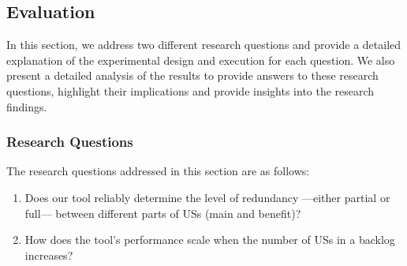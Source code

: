 \subsection{Evaluation}\label{redundancy_evaluation}
In this section, we address two different research questions and provide a detailed explanation of the experimental design and execution for each question. We also present a detailed analysis of the results to provide answers to these research questions, highlight their implications and provide insights into the research findings.
\subsubsection*{Research Questions}
The research questions addressed in this section are as follows:
\begin{enumerate}
	\item Does our tool reliably determine the level of redundancy —either partial or full— between different parts of USs (main and benefit)?
	\item How does the tool's performance scale when the number of USs in a backlog increases?
	\end{enumerate}
